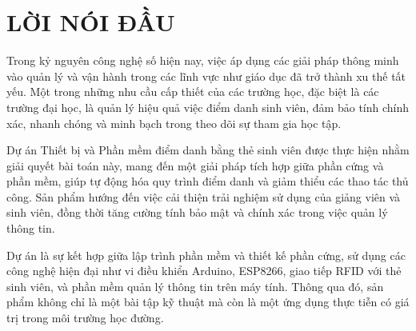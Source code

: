\section*{LỜI NÓI ĐẦU}
\thispagestyle{empty}
Trong kỷ nguyên công nghệ số hiện nay, việc áp dụng các giải pháp thông minh vào quản lý và vận hành trong các lĩnh vực như giáo dục đã trở thành xu thế tất yếu. Một trong những nhu cầu cấp thiết của các trường học, đặc biệt là các trường đại học, là quản lý hiệu quả việc điểm danh sinh viên, đảm bảo tính chính xác, nhanh chóng và minh bạch trong theo dõi sự tham gia học tập.

Dự án Thiết bị và Phần mềm điểm danh bằng thẻ sinh viên được thực hiện nhằm giải quyết bài toán này, mang đến một giải pháp tích hợp giữa phần cứng và phần mềm, giúp tự động hóa quy trình điểm danh và giảm thiểu các thao tác thủ công. Sản phẩm hướng đến việc cải thiện trải nghiệm sử dụng của giảng viên và sinh viên, đồng thời tăng cường tính bảo mật và chính xác trong việc quản lý thông tin.

Dự án là sự kết hợp giữa lập trình phần mềm và thiết kế phần cứng, sử dụng các công nghệ hiện đại như vi điều khiển Arduino, ESP8266, giao tiếp RFID với thẻ sinh viên, và phần mềm quản lý thông tin trên máy tính. Thông qua đó, sản phẩm không chỉ là một bài tập kỹ thuật mà còn là một ứng dụng thực tiễn có giá trị trong môi trường học đường.
\cleardoublepage